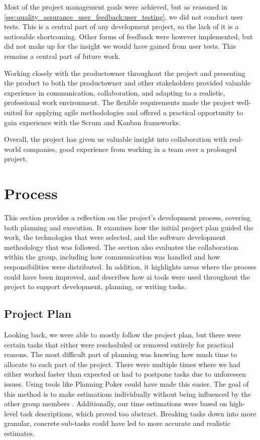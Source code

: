 Most of the project management goals were achieved, but as reasoned in \autoref{sec:quality_assurance_user_feedback:user_testing}, we did not conduct user tests. This is a central part of any development project, so the lack of it is a noticeable shortcoming. Other forms of feedback were however implemented, but did not make up for the insight we would have gained from user tests. This remains a central part of future work.

Working closely with the \gls{productowner} throughout the project and presenting the product to both the \gls{productowner} and other stakeholders provided valuable experience in communication, collaboration, and adapting to a realistic, professional work environment. The flexible requirements made the project well-suited for applying agile methodologies and offered a practical opportunity to gain experience with the Scrum and Kanban frameworks.

Overall, the project has given us valuable insight into collaboration with real-world companies, good experience from working in a team over a prolonged project.

\section{Process}\label{sec:discussion:process}

This section provides a reflection on the project's development process, covering both planning and execution. It examines how the initial project plan guided the work, the technologies that were selected, and the software development methodology that was followed. The section also evaluates the collaboration within the group, including how communication was handled and how responsibilities were distributed. In addition, it highlights areas where the process could have been improved, and describes how \acrshort{ai} tools were used throughout the project to support development, planning, or writing tasks.

\subsection{Project Plan}\label{subsec:discussion:process:projectplan}

Looking back, we were able to mostly follow the project plan, but there were certain tasks that either were rescheduled or removed entirely for practical reasons. The most difficult part of planning was knowing how much time to allocate to each part of the project. There were multiple times where we had either worked faster than expected or had to postpone tasks due to unforeseen issues. Using tools like Planning Poker could have made this easier. The goal of this method is to make estimations individually without being influenced by the other group members \cite{planningpokerwiki}. Additionally, our time estimations were based on high-level task descriptions, which proved too abstract. Breaking tasks down into more granular, concrete sub-tasks could have led to more accurate and realistic estimates.

